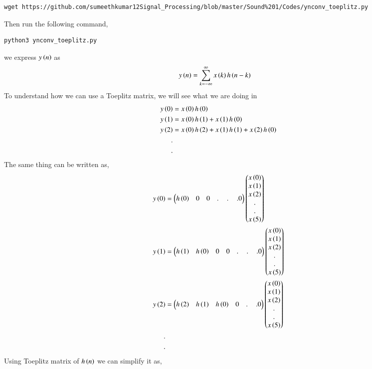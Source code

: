 \documentclass[journal,12pt,twocolumn]{IEEEtran}
\renewcommand\thesection{\arabic{section}}
\begin{document}
\begin{enumerate}[label=\thesection.\arabic*]
     \begin{lstlisting}
wget https://github.com/sumeethkumar12Signal_Processing/blob/master/Sound%201/Codes/ynconv_toeplitz.py
     \end{lstlisting}
    Then run the following command,
     \begin{lstlisting}
python3 ynconv_toeplitz.py
     \end{lstlisting}
    we express $y\left(n\right)$ as
     \begin{align}
       y\left(n\right) &= \sum_{k = -\infty}^{\infty}x\left(k\right)h\left(n-k\right)
     \end{align}
    To understand how we can use a Toeplitz matrix, we will see what we are doing in 
     \begin{align}
      y\left(0\right) &= x\left(0\right)h\left(0\right)\\
      y\left(1\right) &= x\left(0\right)h\left(1\right) + x\left(1\right)h\left(0\right)\\
      y\left(2\right) &= x\left(0\right)h\left(2\right) + x\left(1\right)h\left(1\right) + x\left(2\right)h\left(0\right)\\
      . \nonumber&\\ 
      .& \nonumber
     \end{align}
    The same thing can be written as,
     \begin{align}
       y\left(0\right) &= \begin{pmatrix}h\left(0\right) & 0 & 0 &.\,&.\,&.0\end{pmatrix}\begin{pmatrix}x\left(0\right)\\x\left(1\right)\\x\left(2\right)\\ . \\.\\x\left(5\right)\end{pmatrix}\\
       y\left(1\right) &= \begin{pmatrix}h\left(1\right) & h\left(0\right) & 0 & 0 &.\,&.\,&.0\end{pmatrix}\begin{pmatrix}x\left(0\right)\\x\left(1\right)\\x\left(2\right)\\ . \\.\\x\left(5\right)\end{pmatrix}\\
       y\left(2\right) &= \begin{pmatrix}h\left(2\right) & h\left(1\right) & h\left(0\right) & 0& .\,&.0\end{pmatrix}\begin{pmatrix}x\left(0\right)\\x\left(1\right)\\x\left(2\right)\\ . \\.\\x\left(5\right)\end{pmatrix}\\
       . & \nonumber \\
       .& \nonumber
     \end{align}
    Using Toeplitz matrix of $h\left(n\right)$ we can simplify it as,

\end{enumerate}
\end{document}
